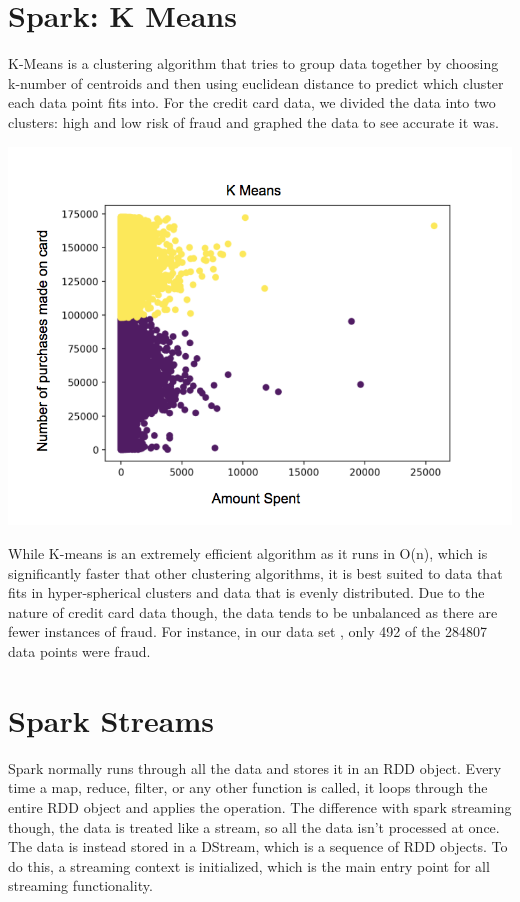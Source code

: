 \documentclass[9pt,twocolumn,twoside]{idsi}
\begin{document}
\section{Spark: K Means }
K-Means is a clustering algorithm that tries to group data together by choosing k-number of centroids and then using euclidean distance to predict which cluster each data point fits into. For the credit card data, we divided the data into two clusters: high and low risk of fraud and graphed the data to see accurate it was. 

\includegraphics[scale=0.6]{two.png}

While K-means is an extremely efficient algorithm as it runs in O(n), which is significantly faster that other clustering algorithms, it is best suited to data that fits in hyper-spherical clusters and data that is evenly distributed. Due to the nature of credit card data though, the data tends to be unbalanced as there are fewer instances of fraud. For instance, in our data set , only 492 of the 284807 data points were fraud. 

\section{Spark Streams}
Spark normally runs through all the data and stores it in an RDD object. Every time a map, reduce, filter, or any other function is called, it loops through the entire RDD object and applies the operation. The difference with spark streaming though, the data is treated like a stream, so all the data isn't processed at once. The data is instead stored in a DStream, which is a sequence of RDD objects. To do this, a streaming context is initialized, which is the main entry point for all streaming functionality. 
\end{document}
